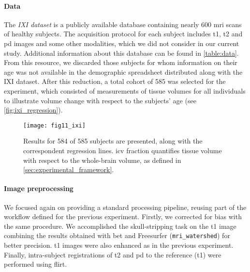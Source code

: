 \paragraph{Data}
The \emph{IXI dataset} \citep{hill_ixi_2006} is a publicly available database
  containing nearly 600 \gls*{mri} scans of healthy subjects.
The acquisition protocol for each subject includes \gls*{t1}, \gls*{t2} and \gls*{pd}
  images and some other modalities, which we did not consider in our current study.
Additional information about this database can be found in \autoref{table:data}.
From this resource, we discarded those subjects for whom information on their age was not
  available in the demographic spreadsheet distributed along with the IXI dataset.
After this reduction, a total cohort of 585 was selected for the experiment,
  which consisted of measurements of tissue volumes for all individuals to
  illustrate volume change with respect to the subjects' age
  (see \autoref{fig:ixi_regression}).
\begin{figure*}
  \texttt{[image: fig11\_ixi]}
  \caption[Volumetry study upon \emph{IXI dataset}]{Results
    for 584 of 585 subjects are presented, along with the correspondent regression lines.
    \Acrfull*{icv} fraction quantifies tissue volume with respect to the whole-brain
    volume, as defined in \autoref{sec:experimental_framework}.}
  \label{fig:ixi_regression}
\end{figure*}

\paragraph{Image preprocessing}
We focused again on providing a standard processing pipeline, reusing part of the
  workflow defined for the previous experiment.
Firstly, we corrected for bias with the same procedure.
We accomplished the skull-stripping task on the \gls*{t1} image combining the results
  obtained with \gls*{bet} and Freesurfer (\texttt{mri\_watershed})
  for better precision.
\Gls*{t1} images were also enhanced as in the previous experiment.
Finally, intra-subject registrations of \gls*{t2} and \gls*{pd} to the reference 
  (\gls*{t1}) were performed using \gls*{flirt}.

